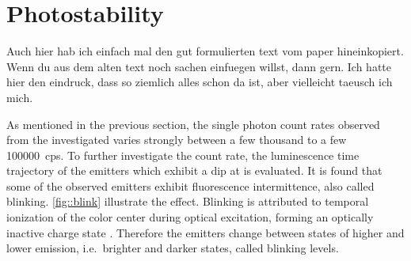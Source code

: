 



	\section{Photostability} \label{subsec::photostab}

		\begin{remark}
			Auch hier hab ich einfach mal den gut formulierten text vom paper hineinkopiert. Wenn du aus dem alten text noch sachen einfuegen willst, dann gern. Ich hatte hier den eindruck, dass so ziemlich alles schon da ist, aber vielleicht taeusch ich mich.
		\end{remark}

		As mentioned in the previous section, the single photon count rates observed from the investigated \sivs varies strongly between a few thousand to a few \SI{100000}{cps}.
		To further investigate the count rate, the luminescence time trajectory of the emitters which exhibit a dip at \gtz is evaluated.
		It is found that some of the observed emitters exhibit fluorescence intermittence, also called blinking. \cref{fig::blink} illustrate the effect.
		Blinking is attributed to temporal ionization of the color center during optical excitation, forming an optically inactive charge state \cite{Jantzen2016,Neu2012a,Gali2013}.
		Therefore the emitters change between states of higher and lower emission, i.e.\ brighter and darker states, called blinking levels.

